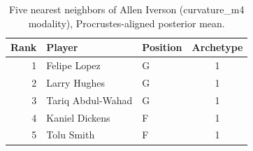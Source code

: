 \begin{table}[htbp]
  \centering\small
  \begin{tabular}{rllc}
    \toprule
    Rank & Player & Position & Archetype \\
    \midrule
    1 & Felipe Lopez & G & 1 \\
    2 & Larry Hughes & G & 1 \\
    3 & Tariq Abdul-Wahad & G & 1 \\
    4 & Kaniel Dickens & F & 1 \\
    5 & Tolu Smith & F & 1 \\
    \bottomrule
  \end{tabular}
  \caption{Five nearest neighbors of Allen Iverson (curvature_m4 modality), Procrustes-aligned posterior mean.}
  \label{tab:Allen_Iverson_neighbors_curvature_m4}
\end{table}

